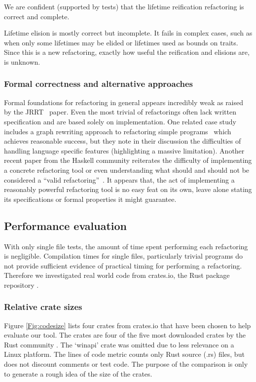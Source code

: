 We are confident (supported by tests) that the lifetime reification refactoring is correct and complete.

Lifetime elision is mostly correct but incomplete. It fails in complex cases, such as when only some lifetimes may be elided or lifetimes used as bounds on traits. Since this is a new refactoring, exactly how useful the reification and elisions are, is unknown.

\subsubsection{Formal correctness and alternative approaches}

Formal foundations for refactoring in general appears incredibly weak as raised by the JRRT~\cite{schafer2010specification} paper. Even the most trivial of refactorings often lack written specification and are based solely on implementation. One related case study includes a graph rewriting approach to refactoring simple programs~\cite{graph} which achieves reasonable success, but they note in their discussion the difficulties of handling language specific features (highlighting a massive limitation). Another recent paper from the Haskell community reiterates the difficulty of implementing a concrete refactoring tool or even understanding what should and should not be considered a ``valid refactoring''~\cite{sculthorpe}. It appears that, the act of implementing a reasonably powerful refactoring tool is no easy feat on its own, leave alone stating its specifications or formal properties it might guarantee.

\subsection{Performance evaluation}\label{S:perfeval}
With only single file tests, the amount of time spent performing each refactoring is negligible. Compilation times for single files, particularly trivial programs do not provide sufficient evidence of practical timing for performing a refactoring. Therefore we investigated real world code from  crates.io, the Rust package repository \cite{cratesio15}. 

\subsubsection{Relative crate sizes}
Figure \ref{Fig:codesize} lists  four crates from crates.io that have been chosen to help evaluate our tool. The crates are four of the five most downloaded crates by the Rust community \cite{cratesio15}. The `winapi' crate was omitted due to less relevance on a Linux platform. The lines of code metric counts only Rust source (.rs) files, but does not discount comments or test code. The purpose of the comparison is only to generate a rough idea of the size of the crates.

